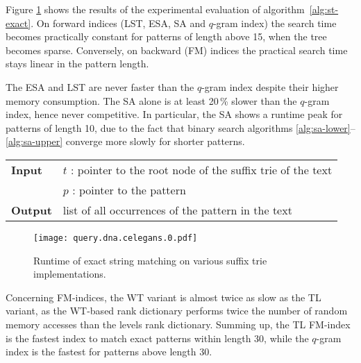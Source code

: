 Figure \ref{fig:query-dna-exact} shows the results of the experimental evaluation of algorithm~\ref{alg:st-exact}.
On forward indices (LST, ESA, SA and $q$-gram index) the search time becomes practically constant for patterns of length above 15, \ie when the tree becomes sparse.
Conversely, on backward (FM) indices the practical search time stays linear in the pattern length. 

The ESA and LST are never faster than the $q$-gram index despite their higher memory consumption.
The SA alone is at least 20\,\% slower than the $q$-gram index, hence never competitive.
In particular, the SA shows a runtime peak for patterns of length 10, due to the fact that binary search algorithms \ref{alg:sa-lower}--\ref{alg:sa-upper} converge more slowly for shorter patterns.

\begin{figure*}[t]
\begin{center}
\begin{minipage}[t]{.8\textwidth}
\begin{algorithm}[H]
\begin{tabular}{ll}
\textbf{Input}  & $t$ : pointer to the root node of the suffix trie of the text\\
				& $p$ : pointer to the pattern\\
\textbf{Output} & list of all occurrences of the pattern in the text\\
\end{tabular}
\begin{algorithmic}[1]
	\State \Report {}
		\State {}
\EndIf
\end{algorithmic}
\label{alg:st-exact}
\end{algorithm}
\end{minipage}
\end{center}
\end{figure*}

\begin{figure}[b]
\begin{center}
\caption[Exact string matching runtime]{Runtime of exact string matching on various suffix trie implementations.}
\label{fig:query-dna-exact}
\texttt{[image: query.dna.celegans.0.pdf]}
\end{center}
\end{figure}


Concerning FM-indices, the WT variant is almost twice as slow as the TL variant, as the WT-based rank dictionary performs twice the number of random memory accesses than the levels rank dictionary.
Summing up, the TL FM-index is the fastest index to match exact patterns within length 30, while the $q$-gram index is the fastest for patterns above length 30.

